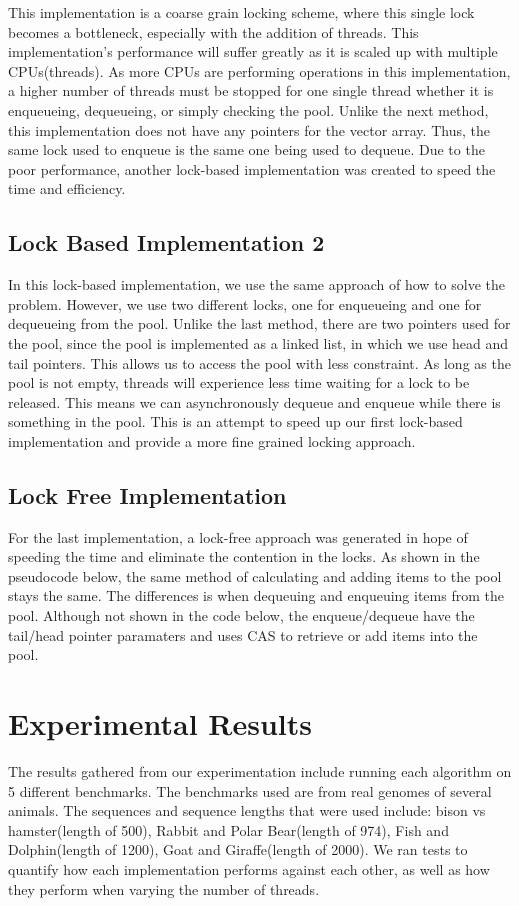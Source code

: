 \documentclass[letterpaper, 10 pt, conference]{IEEEconf}
\begin{document}
This implementation is a coarse grain locking scheme, where this single lock becomes a bottleneck, especially with the addition of threads. This implementation's performance will suffer greatly as it is scaled up with multiple CPUs(threads). As more CPUs are performing operations in this implementation, a higher number of threads must be stopped for one single thread whether it is enqueueing, dequeueing, or simply checking the pool. Unlike the next method, this implementation does not have any pointers for the vector array. Thus, the same lock used to enqueue is the same one being used to dequeue. Due to the poor performance, another lock-based implementation was created to speed the time and efficiency. 
\subsection{Lock Based Implementation 2}
In this lock-based implementation, we use the same approach of how to solve the problem. However, we use two different locks, one for enqueueing and one for dequeueing from the pool. Unlike the last method, there are two pointers used for the pool, since the pool is implemented as a linked list, in which we use head and tail pointers. This allows us to access the pool with less constraint. As long as the pool is not empty, threads will experience less time waiting for a lock to be released. This means we can asynchronously dequeue and enqueue while there is something in the pool. 
This is an attempt to speed up our first lock-based implementation and provide a more fine grained locking approach. 

\subsection{Lock Free Implementation}
For the last implementation, a lock-free approach was generated in hope of speeding the time and eliminate the contention in the locks. As shown in the pseudocode below, the same method of calculating and adding items to the pool stays the same. The differences is when dequeuing and enqueuing items from the pool. Although not shown in the code below, the enqueue/dequeue have the tail/head pointer paramaters and uses CAS to retrieve or add items into the pool. 



\section{Experimental Results}
The results gathered from our experimentation include running each algorithm on 5 different benchmarks. The benchmarks used are from real genomes of several animals. The sequences and sequence lengths that were used include: bison vs hamster(length of 500), Rabbit and Polar Bear(length of 974), Fish and Dolphin(length of 1200), Goat and Giraffe(length of 2000). We ran tests to quantify how each implementation performs against each other, as well as how they perform when varying the number of threads. 
\end{document}
